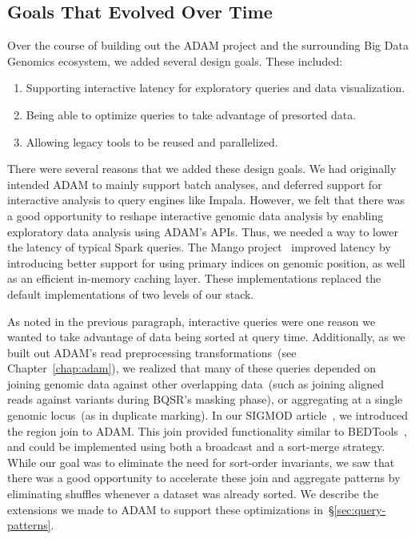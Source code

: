 \documentclass[phd]{ucbthesis}
\begin{document}
\subsection{Goals That Evolved Over Time}
\label{sec:evolved-goals}

Over the course of building out the {ADAM} project and the surrounding
{Big Data Genomics} ecosystem, we added several design goals. These
included:

\begin{enumerate}
\item Supporting interactive latency for exploratory queries and data
  visualization.
\item Being able to optimize queries to take advantage of presorted data.
\item Allowing legacy tools to be reused and parallelized.
\end{enumerate}

There were several reasons that we added these design goals. We had
originally intended {ADAM} to mainly support batch analyses, and deferred
support for interactive analysis to query engines like {Impala}. However,
we felt that there was a good opportunity to reshape interactive genomic data
analysis by enabling exploratory data analysis using {ADAM}'s APIs.
Thus, we needed a way to lower the latency of typical {Spark} queries.
The {Mango} project~\cite{tu16, morrow17} improved latency by introducing
better support for using primary indices on genomic position, as well as an
efficient in-memory caching layer. These implementations replaced the default
implementations of two levels of our stack.

As noted in the previous paragraph, interactive queries were one reason we wanted
to take advantage of data being sorted at query time. Additionally, as we built
out {ADAM}'s read preprocessing transformations~(see
Chapter~\ref{chap:adam}), we realized that many of these queries depended on
joining genomic data against other overlapping data~(such as joining aligned
reads against variants during BQSR's masking phase), or aggregating at a single
genomic locus~(as in duplicate marking). In our SIGMOD article~\cite{nothaft15},
we introduced the region join to {ADAM}. This join provided functionality
similar to {BEDTools}~\cite{quinlan10}, and could be implemented using
both a broadcast and a sort-merge strategy. While our goal was to eliminate the
need for sort-order invariants, we saw that there was a good opportunity to
accelerate these join and aggregate patterns by eliminating shuffles whenever
a dataset was already sorted. We describe the extensions we made to
{ADAM} to support these optimizations in~\S\ref{sec:query-patterns}.
\end{document}
